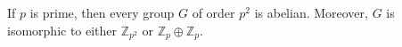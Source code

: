 If $p$ is prime, then every group $G$ of order $p^2$ is abelian. Moreover, $G$ is isomorphic to either $\mathbb{Z}_{p^2}$ or $\mathbb{Z}_p \oplus \mathbb{Z}_p$.
